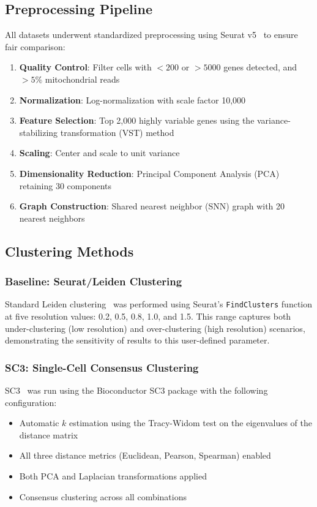 \subsection{Preprocessing Pipeline}

All datasets underwent standardized preprocessing using Seurat v5~\cite{hao2021seurat} to ensure fair comparison:

\begin{enumerate}[noitemsep]
    \item \textbf{Quality Control}: Filter cells with $<200$ or $>5000$ genes detected, and $>5\%$ mitochondrial reads
    \item \textbf{Normalization}: Log-normalization with scale factor 10,000
    \item \textbf{Feature Selection}: Top 2,000 highly variable genes using the variance-stabilizing transformation (VST) method
    \item \textbf{Scaling}: Center and scale to unit variance
    \item \textbf{Dimensionality Reduction}: Principal Component Analysis (PCA) retaining 30 components
    \item \textbf{Graph Construction}: Shared nearest neighbor (SNN) graph with 20 nearest neighbors
\end{enumerate}

\subsection{Clustering Methods}

\subsubsection{Baseline: Seurat/Leiden Clustering}

Standard Leiden clustering~\cite{traag2019leiden} was performed using Seurat's \texttt{FindClusters} function at five resolution values: 0.2, 0.5, 0.8, 1.0, and 1.5. This range captures both under-clustering (low resolution) and over-clustering (high resolution) scenarios, demonstrating the sensitivity of results to this user-defined parameter.

\subsubsection{SC3: Single-Cell Consensus Clustering}

SC3~\cite{kiselev2017sc3} was run using the Bioconductor SC3 package with the following configuration:
\begin{itemize}[noitemsep]
    \item Automatic $k$ estimation using the Tracy-Widom test on the eigenvalues of the distance matrix
    \item All three distance metrics (Euclidean, Pearson, Spearman) enabled
    \item Both PCA and Laplacian transformations applied
    \item Consensus clustering across all combinations
\end{itemize}

